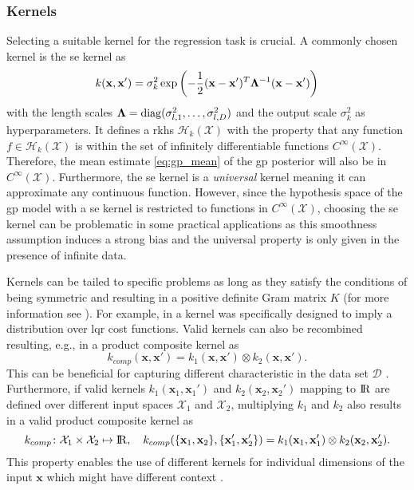 \subsubsection{Kernels}

Selecting a suitable kernel for the regression task is crucial. A commonly chosen kernel is the \gls{se} kernel as 
\begin{equation}
    k(\mathbf{x}, \mathbf{x}') = \sigma_k^2 \exp\left(-\frac{1}{2} (\mathbf{x} - \mathbf{x}')^T \mathrm{\mathbf{\Lambda}}^{-1} (\mathbf{x} - \mathbf{x}')\right)
\end{equation}
with the length scales $\mathrm{\mathbf{\Lambda}} = \mathrm{diag}(\sigma_{l,1}^2, \dots, \sigma_{l,D}^2)$ and the output scale $\sigma_k^2$ as hyperparameters. It defines a \gls{rkhs} $\mathcal{H}_k(\mathcal{X})$ with the property that any function $f \in \mathcal{H}_k(\mathcal{X})$ is within the set of infinitely differentiable functions $C^\infty(\mathcal{X})$. Therefore, the mean estimate \eqref{eq:gp_mean} of the \gls{gp} posterior will also be in $C^\infty(\mathcal{X})$. Furthermore, the \gls{se} kernel is a \emph{universal} kernel meaning it can approximate any continuous function. However, since the hypothesis space of the \gls{gp} model with a \gls{se} kernel is restricted to functions in $C^\infty(\mathcal{X})$, choosing the \gls{se} kernel can be problematic in some practical applications as this smoothness assumption induces a strong bias and the universal property is only given in the presence of infinite data.

Kernels can be tailed to specific problems as long as they satisfy the conditions of being symmetric and resulting in a positive definite Gram matrix $K$ (for more information see \textcite[Chap. 4.1]{Rasmussen_2006}). For example, in \textcite{Marco_2017} a kernel was specifically designed to imply a distribution over \gls{lqr} cost functions. Valid kernels can also be recombined resulting, e.g., in a product composite kernel as
\begin{equation}
    k_{comp}(\mathbf{x}, \mathbf{x}') = k_1(\mathbf{x}, \mathbf{x}') \otimes k_2(\mathbf{x}, \mathbf{x}').
\end{equation} 
This can be beneficial for capturing different characteristic in the data set $\mathcal{D}$ \cite{Duvenaud_2014}. Furthermore, if valid kernels $k_1(\mathbf{x}_1, \mathbf{x}_1')$ and $k_2(\mathbf{x}_2, \mathbf{x}_2')$ mapping to $\mathrm{I\!R}$ are defined over different input spaces $\mathcal{X}_1$ and $\mathcal{X}_2$, multiplying $k_1$ and $k_2$ also results in a valid product composite kernel as
\begin{equation}
    k_{comp}\colon \mathcal{X}_1 \times \mathcal{X}_2 \mapsto \mathrm{I\!R}, \quad k_{comp}(\{\mathbf{x}_1,\mathbf{x}_2\}, \{\mathbf{x}_1',\mathbf{x}_2'\}) = k_1(\mathbf{x}_1, \mathbf{x}_1') \otimes k_2(\mathbf{x}_2, \mathbf{x}_2').
    \label{eq:compsite_kernel_diff}
\end{equation}
This property enables the use of different kernels for individual dimensions of the input $\mathbf{x}$ which might have different context \cite{Krause_2011}.

